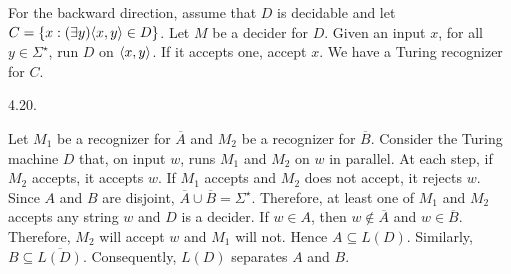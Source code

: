 For the backward direction, assume that $D$ is decidable
and let $C = \{x : (\exists y) \langle x,y\rangle \in D\}$.
Let $M$ be a decider for $D$.
Given an input $x$,
for all $y \in \Sigma^\star$, run $D$ on $\langle x,y\rangle$.
If it accepts one, accept $x$.
We have a Turing recognizer for $C$.
\bigskip
\item{4.20.}

Let $M_1$ be a recognizer for $\overline A$ and $M_2$ be a recognizer for $\overline B$.
Consider the Turing machine $D$ that, on input $w$,
runs $M_1$ and $M_2$ on $w$ in parallel.
At each step, if $M_2$ accepts, it accepts $w$.
If $M_1$ accepts and $M_2$ does not accept, it rejects $w$.
Since $A$ and $B$ are disjoint, $\overline A \cup \overline B = \Sigma^\star$.
Therefore, at least one of $M_1$ and $M_2$ accepts any string $w$
and $D$ is a decider.
If $w \in A$, then $w \notin \overline A$ and $w \in \overline B$.
Therefore, $M_2$ will accept $w$ and $M_1$ will not.
Hence $A \subseteq L(D)$.
Similarly, $B \subseteq \overline{L(D)}$.
Consequently, $L(D)$ separates $A$ and $B$.
\bye 
